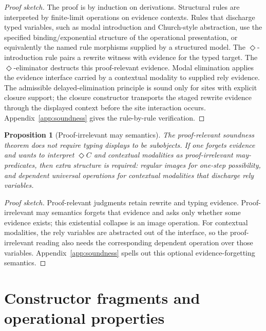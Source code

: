 \documentclass[11pt]{article}
\newcommand{\Dia}{\Diamond}
\newtheorem{proposition}[definition]{Proposition}
\begin{document}
\begin{proof}[Proof sketch]
The proof is by induction on derivations.  Structural rules are interpreted by
finite-limit operations on evidence contexts.  Rules that discharge typed
variables, such as modal introduction and Church-style abstraction, use the
specified binding/exponential structure of the operational presentation, or
equivalently the named rule morphisms supplied by a structured model.  The
\(\Dia\)-introduction rule pairs a rewrite witness with evidence for the typed
target.  The \(\Dia\)-eliminator destructs this proof-relevant evidence.  Modal
elimination applies the evidence interface carried by a contextual modality to
supplied rely evidence.  The admissible delayed-elimination principle is sound
only for sites with explicit closure support; the closure constructor transports
the staged rewrite evidence through the displayed context before the site
interaction occurs.  Appendix~\ref{app:soundness} gives the rule-by-rule
verification.
\end{proof}

\begin{proposition}[Proof-irrelevant may semantics]
\label{prop:regular-may}
The proof-relevant soundness theorem does not require typing displays to be
subobjects.  If one forgets evidence and wants to interpret \(\Dia C\) and
contextual modalities as proof-irrelevant may-predicates, then extra structure
is required: regular images for one-step possibility, and dependent universal
operations for contextual modalities that discharge rely variables.
\end{proposition}

\begin{proof}[Proof sketch]
Proof-relevant judgments retain rewrite and typing evidence.  Proof-irrelevant
may semantics forgets that evidence and asks only whether some evidence exists;
this existential collapse is an image operation.  For contextual modalities, the
rely variables are abstracted out of the interface, so the proof-irrelevant
reading also needs the corresponding dependent operation over those variables.
Appendix~\ref{app:soundness} spells out this optional evidence-forgetting
semantics.
\end{proof}


\section{Constructor fragments and operational properties}
\label{sec:constructor-fragments-operational-properties}
\end{document}
